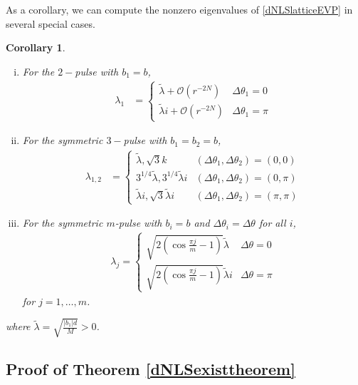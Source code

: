 \documentclass[12pt]{article}
\newtheorem{corollary}{Corollary}
\begin{document}
As a corollary, we can compute the nonzero eigenvalues of \eqref{dNLSlatticeEVP} in several special cases.

\begin{corollary}\[\]
\begin{enumerate}[(i)]
\item For the $2-$pulse with $b_1 = b$,
\begin{align*}
\lambda_1 &= 
\begin{cases}
\tilde{\lambda}  + \mathcal{O}(r^{-2N}) & \Delta\theta_1 = 0 \\
\tilde{\lambda} i + \mathcal{O}(r^{-2N}) & \Delta\theta_1 = \pi
\end{cases}
\end{align*}
\item For the symmetric $3-$pulse with $b_1 = b_2 = b$,
\begin{align*}
\lambda_{1, 2} &= \begin{cases}
\tilde{\lambda}, \sqrt{3} k & (\Delta\theta_1, \Delta\theta_2) = (0, 0) \\
3^{1/4}\tilde{\lambda}, 3^{1/4}\tilde{\lambda}i & (\Delta\theta_1, \Delta\theta_2) = (0, \pi) \\
\tilde{\lambda}i, \sqrt{3} \tilde{\lambda}i & (\Delta\theta_1, \Delta\theta_2) = (\pi, \pi)
\end{cases}
\end{align*}
\item For the symmetric $m$-pulse with $b_i = b$ and $\Delta\theta_i = \Delta\theta$ for all $i$,
\begin{align*}
\lambda_j = \begin{cases}
\sqrt{2\left( \cos\frac{\pi j}{m} - 1 \right)}\tilde{\lambda} & \Delta\theta = 0 \\
\sqrt{2\left( \cos\frac{\pi j}{m} - 1 \right)}\tilde{\lambda}i & \Delta\theta = \pi
\end{cases}
\end{align*}
for $j = 1, \dots, m$.
\end{enumerate}
where $\tilde{\lambda} = \sqrt{\frac{|b_1|d}{M}} > 0$.
\end{corollary}

\subsection{Proof of Theorem \ref{dNLSexisttheorem}}
\end{document}

